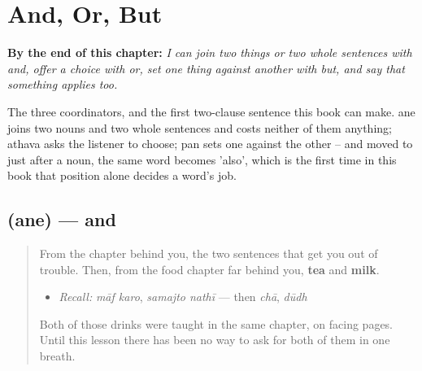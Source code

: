 
\chapter{And, Or, But}
\label{ch:gu-and-or-but}

\begin{chapteropening}
\textbf{By the end of this chapter:} \emph{I can join two things or two whole sentences with and, offer a choice with or, set one thing against another with but, and say that something applies too.}

The three coordinators, and the first two-clause sentence this book can make. ane joins two nouns and two whole sentences and costs neither of them anything; athava asks the listener to choose; pan sets one against the other -- and moved to just after a noun, the same word becomes 'also', which is the first time in this book that position alone decides a word's job.
\end{chapteropening}

\section[\texorpdfstring{\gu{અને} (ane)}{અને (ane)}]{ (ane) — and}

\label{lesson:GU-C32-ane}



\begin{quote}
From the chapter behind you, the two sentences that get you out of trouble. Then, from the food chapter far behind you, \textbf{tea} and \textbf{milk}.

\begin{itemize}
\raggedright
  \item \emph{Recall:} \emph{māf karo}, \emph{samajto nathī} — then \emph{chā}, \emph{dūdh}
\end{itemize}

Both of those drinks were taught in the same chapter, on facing pages. Until this lesson there has been no way to ask for both of them in one breath.
\end{quote}


